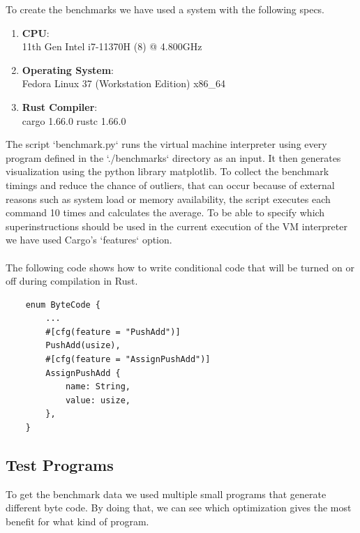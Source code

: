 \documentclass{article}
\begin{document}
To create the benchmarks we have used a system with the following specs.

\begin{enumerate}
    \item \textbf{CPU}:\\
        11th Gen Intel i7-11370H (8) @ 4.800GHz 
    \item \textbf{Operating System}:\\
        Fedora Linux 37 (Workstation Edition) x86\_64 
    \item \textbf{Rust Compiler}:\\
        cargo 1.66.0
        rustc 1.66.0
\end{enumerate}

The script `benchmark.py` runs the virtual machine interpreter using every
program defined in the `./benchmarks` directory as an input. It then generates
visualization using the python library matplotlib. To collect the benchmark
timings and reduce the chance of outliers, that can occur because of external
reasons such as system load or memory availability, the script executes each
command 10 times and calculates the average. To be able to specify which
superinstructions should be used in the current execution of the VM interpreter 
we have used Cargo's `features` option.
\\\\
The following code shows how to write conditional code that will be turned on
or off during compilation in Rust.

\begin{verbatim}
    enum ByteCode {
        ...
        #[cfg(feature = "PushAdd")]
        PushAdd(usize),
        #[cfg(feature = "AssignPushAdd")]
        AssignPushAdd {
            name: String,
            value: usize,
        },
    }
\end{verbatim}

\subsection{Test Programs}
To get the benchmark data we used multiple small programs that generate
different byte code. By doing that, we can see which optimization gives the
most benefit for what kind of program.
\end{document}
